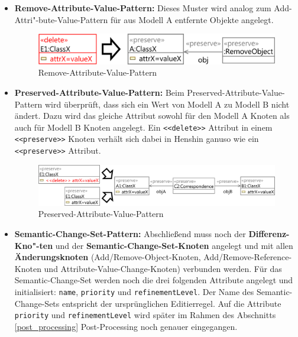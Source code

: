 \begin{itemize}
  \item \textbf{Remove-Attribute-Value-Pattern:} Dieses Muster wird analog zum
  Add-Attri"-bute-Value-Pattern für aus Modell A entfernte Objekte angelegt.
  
  \begin{figure}[htbp]
    \centering
    \includegraphics[scale=0.8]{images/pattern_remove_attribute_value.png}
    \caption{Remove-Attribute-Value-Pattern}
  \end{figure}
  
  \item \textbf{Preserved-Attribute-Value-Pattern:} Beim Preserved-Attribute-Value-Pattern wird
  überprüft, dass sich ein Wert von Modell A zu Modell B nicht ändert. Dazu wird das
  gleiche Attribut sowohl für den Modell A  Knoten als auch für Modell B Knoten angelegt. Ein
  \texttt{<<delete>>} Attribut in einem \texttt{<<preserve>>} Knoten verhält sich dabei in Henshin
  ganuso wie ein \texttt{<<preserve>>} Attribut.
  
  
  \begin{figure}[htbp]
    \centering
    \includegraphics[scale=0.8]{images/pattern_preserve_attribute_value.png}
    \caption{Preserved-Attribute-Value-Pattern}
    \label{avc-preserve}
  \end{figure}
  
  \item \textbf{Semantic-Change-Set-Pattern:} Abschließend muss noch der
  \textbf{Differenz-Kno"-ten} und der \textbf{Semantic-Change-Set-Knoten} angelegt und mit allen \textbf{Änderungsknoten}
  (Add/Remove-Object-Knoten, Add/Remove-Reference-Knoten und Attribute-Value-Change-Knoten)
  verbunden werden. Für das Semantic-Change-Set werden noch die drei folgenden Attribute angelegt und
  initialisiert: \texttt{name}, \texttt{priority} und \texttt{refinementLevel}. Der Name des
  Semantic-Change-Sets entspricht der ursprünglichen Editierregel. Auf die Attribute
  \texttt{priority} und \texttt{refinementLevel} wird später im Rahmen des Abschnitts
  \ref{post_processing} Post-Processing noch genauer eingegangen.


\end{itemize}
